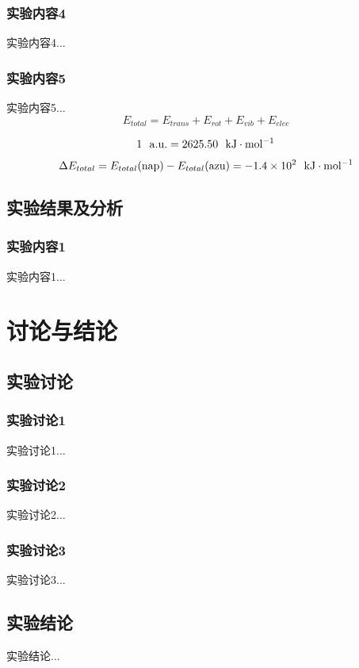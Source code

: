 \documentclass[12pt]{article}
\begin{document}
	 		\subsubsection{实验内容4}
	 			实验内容4...
	 		\subsubsection{实验内容5}
	 			实验内容5...
	 			$$ E_{total}=E_{trans}+E_{rot}+E_{vib}+E_{elec} $$ 
	 	
	 			$$ 1\ \ {\rm a.u.}=2625.50 \ \ {\rm kJ \cdot mol^{-1}} $$
	 			
	 			$$\Delta E_{total}=E_{total}({\rm nap})-E_{total}{\rm (azu)=-1.4\times10^{2} \ \ kJ \cdot mol^{-1} }$$
	 	
	 		
	 	\subsection{实验结果及分析}
			\subsubsection{实验内容1}
	 			实验内容1...
 			
	\vbox{} 
 	
 	\section{讨论与结论}
		\subsection{实验讨论}
 			\subsubsection{实验讨论1}
 	 			实验讨论1...
 	 		\subsubsection{实验讨论2}
 	 			实验讨论2...
 	 		\subsubsection{实验讨论3}
 	 			实验讨论3...
 	 
 		 \subsection{实验结论}
 	 		实验结论...

\vbox{}  
%
%
\end{document}
